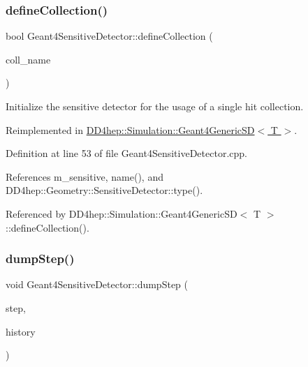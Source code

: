 \subsubsection{\texorpdfstring{define\+Collection()}{defineCollection()}}
{\footnotesize\ttfamily bool Geant4\+Sensitive\+Detector\+::define\+Collection (\begin{DoxyParamCaption}\item[{const std\+::string \&}]{coll\+\_\+name }\end{DoxyParamCaption})\hspace{0.3cm}{\ttfamily [virtual]}}



Initialize the sensitive detector for the usage of a single hit collection. 



Reimplemented in \hyperlink{class_d_d4hep_1_1_simulation_1_1_geant4_generic_s_d_a3c70c7c1f1be8bd0e6364327e28228e4}{D\+D4hep\+::\+Simulation\+::\+Geant4\+Generic\+S\+D$<$ T $>$}.



Definition at line 53 of file Geant4\+Sensitive\+Detector.\+cpp.



References m\+\_\+sensitive, name(), and D\+D4hep\+::\+Geometry\+::\+Sensitive\+Detector\+::type().



Referenced by D\+D4hep\+::\+Simulation\+::\+Geant4\+Generic\+S\+D$<$ T $>$\+::define\+Collection().

\hypertarget{class_d_d4hep_1_1_simulation_1_1_geant4_sensitive_detector_aa5dfd46956ecfddd3815e12be4436430}{}\label{class_d_d4hep_1_1_simulation_1_1_geant4_sensitive_detector_aa5dfd46956ecfddd3815e12be4436430} 
\subsubsection{\texorpdfstring{dump\+Step()}{dumpStep()}}
{\footnotesize\ttfamily void Geant4\+Sensitive\+Detector\+::dump\+Step (\begin{DoxyParamCaption}\item[{G4\+Step $\ast$}]{step,  }\item[{G4\+Touchable\+History $\ast$}]{history }\end{DoxyParamCaption})\hspace{0.3cm}{\ttfamily [protected]}}



